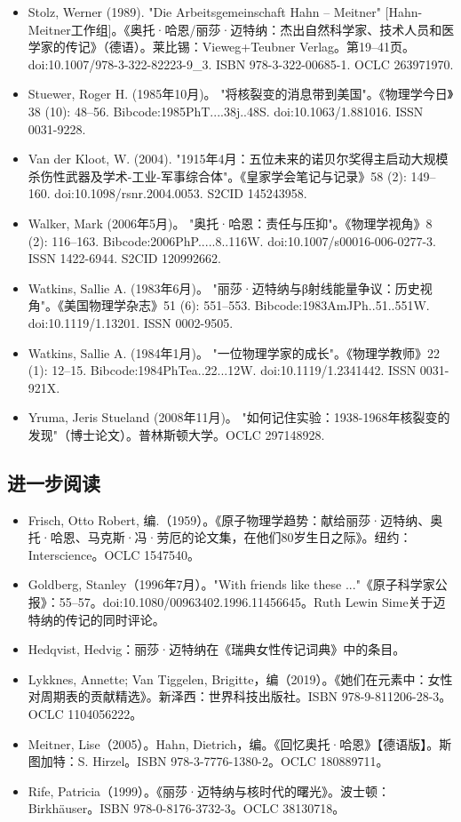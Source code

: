 \begin{itemize}
\item Stolz, Werner (1989). "Die Arbeitsgemeinschaft Hahn – Meitner" [Hahn-Meitner工作组]。《奥托·哈恩/丽莎·迈特纳：杰出自然科学家、技术人员和医学家的传记》（德语）。莱比锡：Vieweg+Teubner Verlag。第19–41页。doi:10.1007/978-3-322-82223-9\_3. ISBN 978-3-322-00685-1. OCLC 263971970.
\item Stuewer, Roger H. (1985年10月)。 "将核裂变的消息带到美国"。《物理学今日》38 (10): 48–56. Bibcode:1985PhT....38j..48S. doi:10.1063/1.881016. ISSN 0031-9228.
\item Van der Kloot, W. (2004). "1915年4月：五位未来的诺贝尔奖得主启动大规模杀伤性武器及学术-工业-军事综合体"。《皇家学会笔记与记录》58 (2): 149–160. doi:10.1098/rsnr.2004.0053. S2CID 145243958.
\item Walker, Mark (2006年5月)。 "奥托·哈恩：责任与压抑"。《物理学视角》8 (2): 116–163. Bibcode:2006PhP.....8..116W. doi:10.1007/s00016-006-0277-3. ISSN 1422-6944. S2CID 120992662.
\item Watkins, Sallie A. (1983年6月)。 "丽莎·迈特纳与β射线能量争议：历史视角"。《美国物理学杂志》51 (6): 551–553. Bibcode:1983AmJPh..51..551W. doi:10.1119/1.13201. ISSN 0002-9505.
\item Watkins, Sallie A. (1984年1月)。 "一位物理学家的成长"。《物理学教师》22 (1): 12–15. Bibcode:1984PhTea..22...12W. doi:10.1119/1.2341442. ISSN 0031-921X.
\item Yruma, Jeris Stueland (2008年11月)。 "如何记住实验：1938-1968年核裂变的发现"（博士论文）。普林斯顿大学。OCLC 297148928.
\end{itemize}
\subsection{进一步阅读}
\begin{itemize}
\item Frisch, Otto Robert, 编.（1959）。《原子物理学趋势：献给丽莎·迈特纳、奥托·哈恩、马克斯·冯·劳厄的论文集，在他们80岁生日之际》。纽约：Interscience。OCLC 1547540。
\item Goldberg, Stanley（1996年7月）。"With friends like these ..."《原子科学家公报》：55–57。doi:10.1080/00963402.1996.11456645。Ruth Lewin Sime关于迈特纳的传记的同时评论。
\item Hedqvist, Hedvig：丽莎·迈特纳在《瑞典女性传记词典》中的条目。
\item Lykknes, Annette; Van Tiggelen, Brigitte，编（2019）。《她们在元素中：女性对周期表的贡献精选》。新泽西：世界科技出版社。ISBN 978-9-811206-28-3。OCLC 1104056222。
\item Meitner, Lise（2005）。Hahn, Dietrich，编。《回忆奥托·哈恩》【德语版】。斯图加特：S. Hirzel。ISBN 978-3-7776-1380-2。OCLC 180889711。
\item Rife, Patricia（1999）。《丽莎·迈特纳与核时代的曙光》。波士顿：Birkhäuser。ISBN 978-0-8176-3732-3。OCLC 38130718。
\end{itemize}

